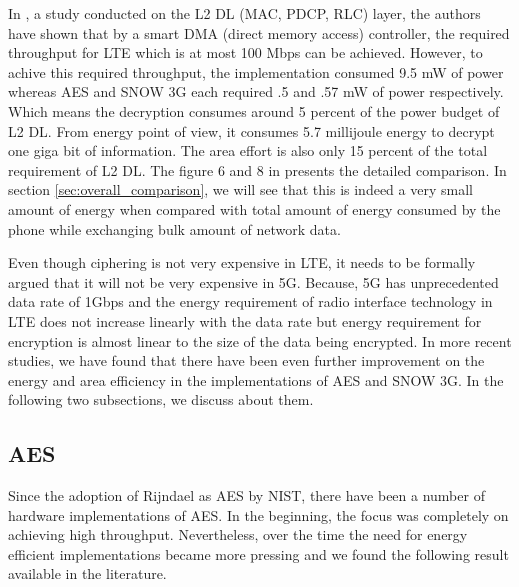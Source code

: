 In \cite{IIS_Ruhr_2010}, a study conducted on the L2 DL (MAC, PDCP, RLC) layer, the authors have shown that by a smart DMA (direct memory access) controller, the required throughput for LTE which is at most 100 Mbps can be achieved. However, to achive this required throughput, the implementation consumed 9.5 mW of power whereas AES and SNOW 3G each required .5 and .57 mW of power respectively. Which means the decryption consumes around 5 percent of the power budget of L2 DL. From energy point of view, it consumes 5.7 millijoule energy to decrypt one giga bit of information. The area effort is also only 15 percent of the total requirement of L2 DL. The figure 6 and 8 in \cite{IIS_Ruhr_2010} presents the detailed comparison. In section \ref{sec:overall_comparison}, we will see that this is indeed a very small amount of energy when compared with total amount of energy consumed by the phone while exchanging bulk amount of network data.


Even though ciphering is not very expensive in LTE, it needs to be formally argued that it will not be very expensive in 5G. Because, 5G has unprecedented data rate of 1Gbps and the energy requirement of radio interface technology in LTE does not increase linearly with the data rate but energy requirement for encryption is almost linear to the size of the data being encrypted. In more recent studies, we have found that there have been even further improvement on the energy and area efficiency in the implementations of AES and SNOW 3G. In the following two subsections, we discuss about them.

\subsection{AES} Since the adoption of Rijndael as AES by NIST, there have been a number of hardware implementations of AES. In the beginning, the focus was completely on achieving high throughput. Nevertheless, over the time the need for energy efficient implementations became more pressing and we found the following result available in the literature. \newline


